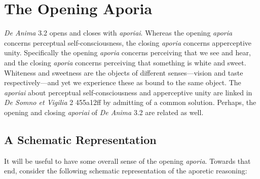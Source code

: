 
\section{The Opening Aporia} %
\label{sec:the_opening_aporia}

\emph{De Anima} 3.2 opens and closes with \emph{aporiai}. Whereas the opening \emph{aporia} concerns perceptual self-consciousness, the closing \emph{aporia} concerns apperceptive unity. Spe\-cifically the opening \emph{aporia} concerns perceiving that we see and hear, and the closing \emph{aporia} concerns perceiving that something is white and sweet. Whiteness and sweetness are the objects of different senses—vision and taste respectively—and yet we experience these as bound to the same object. The \emph{aporiai} about perceptual self-consciousness and apperceptive unity are linked in \emph{De Somno et Vigilia} 2 455a12ff by admitting of a common solution. Perhaps, the opening and closing \emph{aporiai} of \emph{De Anima} 3.2 are related as well.

\subsection{A Schematic Representation} %
\label{sub:a_schematic_representation}

It will be useful to have some overall sense of the opening \emph{aporia}. Towards that end, consider the following schematic representation of the aporetic reasoning:

